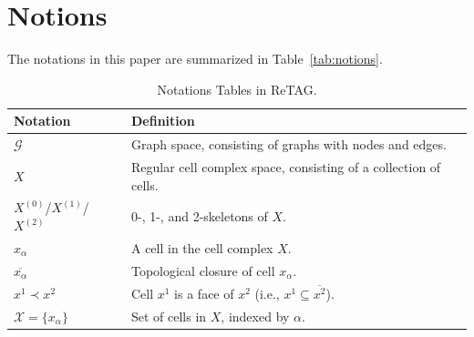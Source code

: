 \clearpage
\appendix
\section{Notions}
The notations in this paper are summarized in Table~\ref{tab:notions}.
\begin{table}[h!]
\centering
\renewcommand{\arraystretch}{1.2}
\label{notion}
\caption{Notations Tables in ReTAG.}
\begin{tabular}{@{}lp{11cm}@{}}
\toprule
\textbf{Notation} & \textbf{Definition} \\ \midrule
$\mathcal{G}$ & Graph space, consisting of graphs with nodes and edges. \\
$X$ & Regular cell complex space, consisting of a collection of cells. \\
$X^{(0)}$/$X^{(1)}$/$X^{(2)}$ & 0-, 1-, and 2-skeletons of $X$. \\

$x_\alpha$ & A cell in the cell complex $X$. \\
$\overline{x_\alpha}$ & Topological closure of cell $x_\alpha$. \\
$x^1 \prec x^2$ & Cell $x^1$ is a face of $x^2$ (i.e., $x^1 \subseteq \overline{x^2}$). \\
$\mathcal{X}=\{x_\alpha\}$ & Set of cells in $X$, indexed by $\alpha$. \\


\end{tabular}
\end{table}
